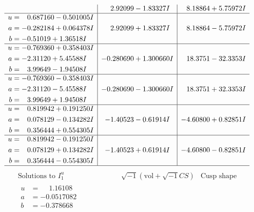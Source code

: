 \documentclass[1p]{elsarticle_modified}
\theoremstyle{definition}
\newcommand{\I}{\sqrt{-1}}
\begin{document}
$$\begin{array}{c|c|c}
 & \phantom{-}2.92099 - 1.83327 I & \phantom{-}8.18864 + 5.75972 I \\ \hline\begin{aligned}
u &= \phantom{-}0.687160 - 0.501005 I \\
a &= -0.282184 + 0.064378 I \\
b &= -0.51019 + 1.36518 I\end{aligned}
 & \phantom{-}2.92099 + 1.83327 I & \phantom{-}8.18864 - 5.75972 I \\ \hline\begin{aligned}
u &= -0.769360 + 0.358403 I \\
a &= -2.31120 + 5.45588 I \\
b &= \phantom{-}3.99649 - 1.94508 I\end{aligned}
 & -0.280690 + 1.300660 I & \phantom{-}18.3751 - 32.3353 I \\ \hline\begin{aligned}
u &= -0.769360 - 0.358403 I \\
a &= -2.31120 - 5.45588 I \\
b &= \phantom{-}3.99649 + 1.94508 I\end{aligned}
 & -0.280690 - 1.300660 I & \phantom{-}18.3751 + 32.3353 I \\ \hline\begin{aligned}
u &= \phantom{-}0.819942 + 0.191250 I \\
a &= \phantom{-}0.078129 - 0.134282 I \\
b &= \phantom{-}0.356444 + 0.554305 I\end{aligned}
 & -1.40523 - 0.61914 I & -4.60800 + 0.82851 I \\ \hline\begin{aligned}
u &= \phantom{-}0.819942 - 0.191250 I \\
a &= \phantom{-}0.078129 + 0.134282 I \\
b &= \phantom{-}0.356444 - 0.554305 I\end{aligned}
 & -1.40523 + 0.61914 I & -4.60800 - 0.82851 I\\
 \hline 
 \end{array}$$\newpage$$\begin{array}{c|c|c}  
\text{Solutions to }I^u_{1}& \I (\text{vol} + \sqrt{-1}CS) & \text{Cusp shape}\\
 \hline 
\begin{aligned}
u &= \phantom{-}1.16108\phantom{ +0.000000I} \\
a &= -0.0517082\phantom{ +0.000000I} \\
b &= -0.378668\phantom{ +0.000000I}\end{aligned}

\end{array}$$
\end{document}
